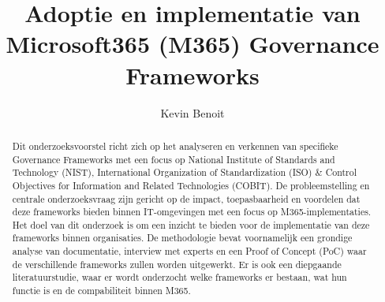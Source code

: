 \documentclass{hogent-article}
\title{Adoptie en implementatie van Microsoft365 (M365) Governance Frameworks}
\author{Kevin Benoit}
\begin{document}
\begin{abstract}
Dit onderzoeksvoorstel richt zich op het analyseren en verkennen van specifieke Governance Frameworks met een focus op National Institute of Standards and Technology (NIST), International Organization of Standardization (ISO) & Control Objectives for Information and Related Technologies (COBIT). De probleemstelling en centrale onderzoeksvraag zijn gericht op de impact, toepasbaarheid en voordelen dat deze frameworks bieden binnen IT-omgevingen met een focus op M365-implementaties. Het doel van dit onderzoek is om een inzicht te bieden voor de implementatie van deze frameworks binnen organisaties.  De methodologie bevat voornamelijk een grondige analyse van documentatie, interview met experts en een Proof of Concept (PoC) waar de verschillende frameworks zullen worden uitgewerkt. Er is ook een diepgaande literatuurstudie, waar er wordt onderzocht welke frameworks er bestaan, wat hun functie is en de compabiliteit binnen M365. 

\end{abstract}

\tableofcontents



\printbibliography[heading=bibintoc]
\end{document}
